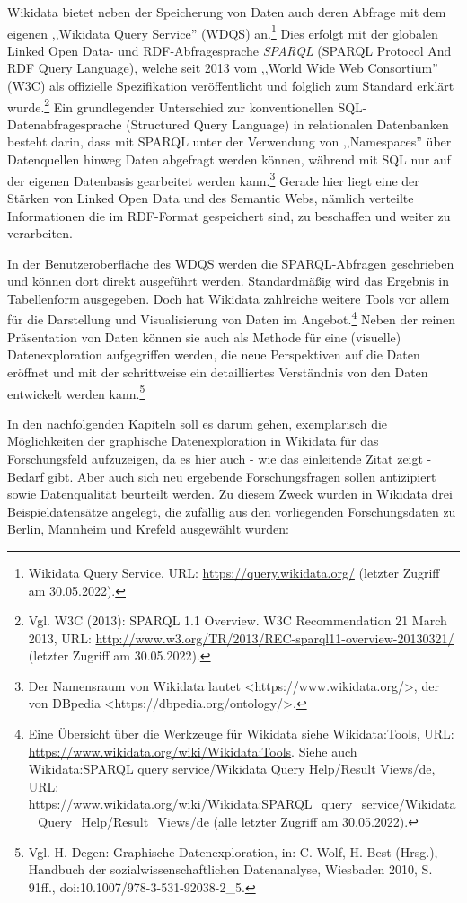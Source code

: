 Wikidata bietet neben der Speicherung von Daten auch deren Abfrage mit dem eigenen ,,Wikidata Query Service'' (WDQS) an.\footnote{Wikidata Query Service, URL: \url{https://query.wikidata.org/} (letzter Zugriff am 30.05.2022).} Dies erfolgt mit der globalen Linked Open Data- und RDF-Abfragesprache \textit{SPARQL} (SPARQL Protocol And RDF Query Language), welche seit 2013 vom ,,World Wide Web Consortium'' (W3C) als offizielle Spezifikation veröffentlicht und folglich zum Standard erklärt wurde.\footnote{Vgl. W3C (2013): SPARQL 1.1 Overview. W3C Recommendation 21 March 2013, URL: \url{http://www.w3.org/TR/2013/REC-sparql11-overview-20130321/} (letzter Zugriff am 30.05.2022).} Ein grundlegender Unterschied zur konventionellen SQL-Datenabfragesprache (Structured Query Language) in relationalen Datenbanken besteht darin, dass mit SPARQL unter der Verwendung von ,,Namespaces'' über Datenquellen hinweg Daten abgefragt werden können, während mit SQL nur auf der eigenen Datenbasis gearbeitet werden kann.\footnote{Der Namensraum von Wikidata lautet <https://www.wikidata.org/>, der von DBpedia <https://dbpedia.org/ontology/>.} Gerade hier liegt eine der Stärken von Linked Open Data und des Semantic Webs, nämlich verteilte Informationen die im RDF-Format gespeichert sind, zu beschaffen und  weiter zu verarbeiten. 

In der Benutzeroberfläche des WDQS werden die SPARQL-Abfragen geschrieben und können dort direkt ausgeführt werden. Standardmäßig wird das Ergebnis in Tabellenform ausgegeben. Doch hat Wikidata zahlreiche weitere Tools vor allem für die Darstellung und Visualisierung von Daten im Angebot.\footnote{Eine Übersicht über die Werkzeuge für Wikidata siehe Wikidata:Tools, URL: \url{https://www.wikidata.org/wiki/Wikidata:Tools}. Siehe auch Wikidata:SPARQL query service/Wikidata Query Help/Result Views/de, URL: \url{https://www.wikidata.org/wiki/Wikidata:SPARQL_query_service/Wikidata_Query_Help/Result_Views/de} (alle letzter Zugriff am 30.05.2022).} Neben der reinen Präsentation von Daten können sie auch als Methode für eine (visuelle) Datenexploration aufgegriffen werden, die neue Perspektiven auf die Daten eröffnet und mit der schrittweise ein detailliertes Verständnis von den Daten entwickelt werden kann.\footnote{Vgl. H. Degen: Graphische Datenexploration, in: C. Wolf, H. Best (Hrsg.), Handbuch der sozialwissenschaftlichen Datenanalyse, Wiesbaden 2010, S. 91ff., doi:10.1007/978-3-531-92038-2\_5.} 

In den nachfolgenden Kapiteln soll es darum gehen, exemplarisch die Möglichkeiten der graphische Datenexploration in Wikidata für das Forschungsfeld aufzuzeigen, da es hier auch - wie das einleitende Zitat zeigt - Bedarf gibt. Aber auch sich neu ergebende Forschungsfragen sollen antizipiert sowie Datenqualität beurteilt werden. Zu diesem Zweck wurden in Wikidata drei Beispieldatensätze angelegt, die zufällig aus den vorliegenden Forschungsdaten zu Berlin, Mannheim und Krefeld ausgewählt wurden:

